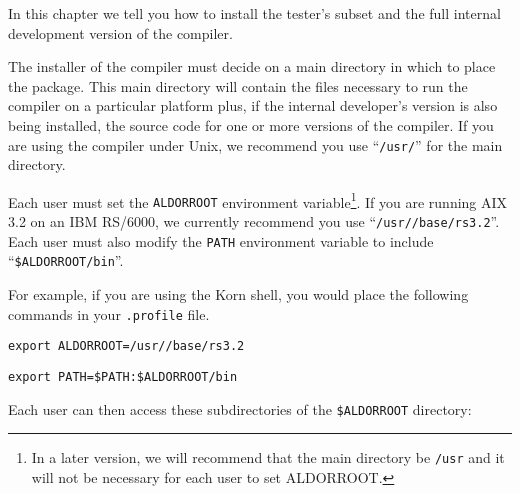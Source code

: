 
In this chapter we tell you how to install the tester's subset
and the full internal development version of the compiler.


The installer of the compiler must decide on a main directory in
which to place the package.
This main directory will contain the files necessary to run the
compiler on a particular platform plus, if the internal
developer's version is also being installed, the source code for
one or more versions of the compiler.
If you are using the compiler under Unix, we recommend you
use ``{\tt /usr/\asharpcmd{}}'' for the main directory.

Each user must set the {\tt ALDORROOT}
environment
variable\footnote{In a later version, we will recommend that the main
directory be {\tt /usr} and it will not be necessary for each user
to set ALDORROOT.}.
If you are running AIX 3.2 on an IBM RS/6000, we currently recommend
you use ``{\tt /usr/\asharpcmd{}/base/rs3.2}''.
Each user must also modify the {\tt PATH} environment variable to
include ``{\tt \$ALDORROOT/bin}''.

For example, if you are using the Korn shell, you would place
the following commands in  your {\tt .profile} file.

{\tt export ALDORROOT=/usr/\asharpcmd{}/base/rs3.2}

{\tt export PATH=\$PATH:\$ALDORROOT/bin}

Each user can then access these subdirectories of
the {\tt \$ALDORROOT} directory:

